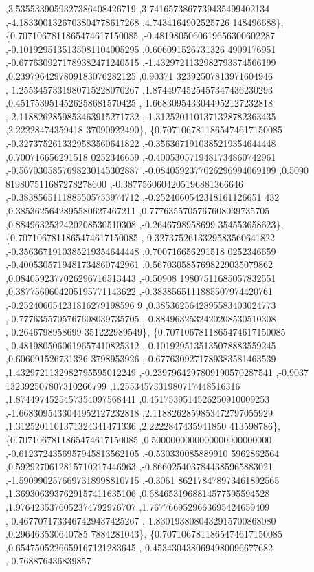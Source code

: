 \begin{DoxyCode}
       ,3.5355339059327386408426719 ,3.7416573867739435499402134 ,-4.1833001326703804778617268 ,4.7434164902525726
      148496688\},
\{0.7071067811865474617150085 ,-0.4819805060619656300602287 ,-0.1019295135135081104005295 ,0.606091526731326
      4909176951 ,-0.6776309271789382471240515 ,-1.4329721132982793374566199 ,0.2397964297809183076282125 ,0.90371
      32392507813971604946 ,-1.2553457331980715228070267 ,1.8744974525457347436230293 ,0.4517539514526258681570425
       ,-1.6683095433044952127232818 ,-2.1188262859853463915271732 ,-1.3125201101371328782363435 ,2.22228474359418
      37090922490\},
\{0.7071067811865474617150085 ,-0.3273752613329583560641822 ,-0.3563671910385219354644448 ,0.700716656291518
      0252346659 ,-0.4005305719481734860742961 ,-0.5670305857698230145302887 ,-0.0840592377026296994069199 ,0.5090
      819807511687278278600 ,-0.3877560604205196881366646 ,-0.3838565111885505753974712 ,-0.2524060542318161126651
      432 ,0.3853625642895580627467211 ,0.7776355705767608039735705 ,0.8849632532420208530510308 ,-0.2646798958699
      354553658623\},
\{0.7071067811865474617150085 ,-0.3273752613329583560641822 ,-0.3563671910385219354644448 ,0.700716656291518
      0252346659 ,-0.4005305719481734860742961 ,0.5670305857698229035079862 ,0.0840592377026296716513443 ,-0.50908
      19807511685057832551 ,0.3877560604205195771143622 ,-0.3838565111885507974420761 ,-0.252406054231816279198596
      9 ,0.3853625642895583403024773 ,-0.7776355705767608039735705 ,-0.8849632532420208530510308 ,-0.2646798958699
      351222989549\},
\{0.7071067811865474617150085 ,-0.4819805060619657410825312 ,-0.1019295135135078883559245 ,0.606091526731326
      3798953926 ,-0.6776309271789383581463539 ,1.4329721132982795595012249 ,-0.2397964297809190570287541 ,-0.9037
      132392507807310266799 ,1.2553457331980717448516316 ,1.8744974525457354097568441 ,0.4517539514526250910009253
       ,-1.6683095433044952127232818 ,2.1188262859853472797055929 ,1.3125201101371324341471336 ,2.2222847435941850
      413598786\},
\{0.7071067811865474617150085 ,0.5000000000000000000000000 ,-0.6123724356957945813562105 ,-0.530330085889910
      5962862564 ,0.5929270612815710217446963 ,-0.8660254037844385965883021 ,-1.5909902576697318998810715 ,-0.3061
      862178478973461892565 ,1.3693063937629157411635106 ,0.6846531968814577595594528 ,1.9764235376052374792976707
       ,1.7677669529663695424659409 ,-0.4677071733467429437425267 ,-1.8301938080432915700868080 ,0.296463530640785
      7884281043\},
\{0.7071067811865474617150085 ,0.6547505226659167121283645 ,-0.4534304380694980096677682 ,-0.768876436839857

\end{DoxyCode}
